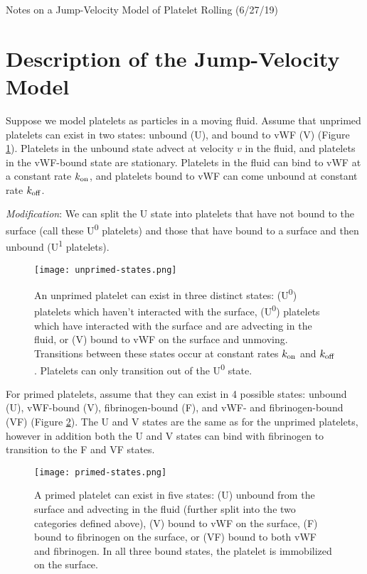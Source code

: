 \documentclass{article}
\newcommand{\tn}{\textnormal}
\begin{document}
\pagestyle{plain}

\begin{center}
  {\Large Notes on a Jump-Velocity Model of Platelet Rolling (6/27/19)}
\end{center}

\section{Description of the Jump-Velocity Model}
\label{sec:jump-vel}

Suppose we model platelets as particles in a moving fluid. Assume that
unprimed platelets can exist in two states: unbound (U), and bound to
vWF (V) (Figure \ref{fig:unprimed-states}). Platelets in the unbound
state advect at velocity $v$ in the fluid, and platelets in the
vWF-bound state are stationary. Platelets in the fluid can bind to vWF
at a constant rate $k_\tn{on}$, and platelets bound to vWF can come
unbound at constant rate $k_\tn{off}$.

\emph{Modification}: We can split the U state into platelets that have
not bound to the surface (call these U\textsuperscript{0} platelets)
and those that have bound to a surface and then unbound
(U\textsuperscript{1} platelets).

\begin{figure}[h]
  \centering
  \texttt{[image: unprimed-states.png]}
  \caption[Possible states of unprimed platelets]{An unprimed platelet
    can exist in three distinct states: (U\textsuperscript{0})
    platelets which haven't interacted with the surface,
    (U\textsuperscript{0}) platelets which have interacted with the
    surface and are advecting in the fluid, or (V) bound to vWF on the
    surface and unmoving. Transitions between these states occur at
    constant rates $k_\tn{on}$ and $k_\tn{off}$. Platelets can only
    transition out of the U\textsuperscript{0} state.}
  \label{fig:unprimed-states}
\end{figure}

For primed platelets, assume that they can exist in 4 possible states:
unbound (U), vWF-bound (V), fibrinogen-bound (F), and vWF- and
fibrinogen-bound (VF) (Figure \ref{fig:primed-states}). The U and V
states are the same as for the unprimed platelets, however in addition
both the U and V states can bind with fibrinogen to transition to the
F and VF states. 

\begin{figure}[h]
  \centering
  \texttt{[image: primed-states.png]}
  \caption[Possible states of primed platelets]{A primed platelet can
    exist in five states: (U) unbound from the surface and advecting
    in the fluid (further split into the two categories defined
    above), (V) bound to vWF on the surface, (F) bound to fibrinogen
    on the surface, or (VF) bound to both vWF and fibrinogen. In all
    three bound states, the platelet is immobilized on the surface.}
  \label{fig:primed-states}
\end{figure}
\end{document}
